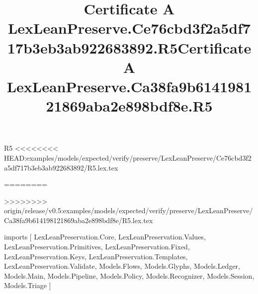 \begin{lexlean}{R5}
<<<<<<<< HEAD:examples/models/expected/verify/preserve/LexLeanPreserve/Ce76cbd3f2a5df717b3eb3ab922683892/R5.lex.tex
\title{Certificate A LexLeanPreserve.Ce76cbd3f2a5df717b3eb3ab922683892.R5}
========
\title{Certificate A LexLeanPreserve.Ca38fa9b614198121869aba2e898bdf8e.R5}
>>>>>>>> origin/release/v0.5:examples/models/expected/verify/preserve/LexLeanPreserve/Ca38fa9b614198121869aba2e898bdf8e/R5.lex.tex
\begin{coremodule}
imports [
  LexLeanPreservation.Core,
  LexLeanPreservation.Values,
  LexLeanPreservation.Primitives,
  LexLeanPreservation.Fixed,
  LexLeanPreservation.Keys,
  LexLeanPreservation.Templates,
  LexLeanPreservation.Validate,
  Models.Flows,
  Models.Glyphs,
  Models.Ledger,
  Models.Main,
  Models.Pipeline,
  Models.Policy,
  Models.Recognizer,
  Models.Session,
  Models.Triage
]


\end{coremodule}
\end{lexlean}
